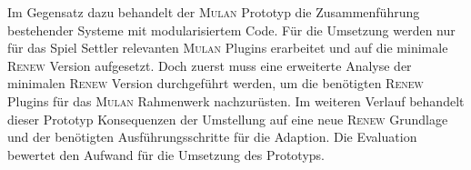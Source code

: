 	Im Gegensatz dazu behandelt der \textsc{Mulan} Prototyp die Zusammenführung bestehender Systeme mit modularisiertem Code. Für die Umsetzung werden nur für das Spiel Settler relevanten \textsc{Mulan} Plugins erarbeitet und auf die minimale \textsc{Renew} Version aufgesetzt. Doch zuerst muss eine erweiterte Analyse der minimalen \textsc{Renew} Version durchgeführt werden, um die benötigten \textsc{Renew} Plugins für das \textsc{Mulan} Rahmenwerk nachzurüsten. Im weiteren Verlauf behandelt dieser Prototyp Konsequenzen der Umstellung auf eine neue \textsc{Renew} Grundlage und der benötigten Ausführungsschritte für die Adaption. Die Evaluation bewertet den Aufwand für die Umsetzung des Prototyps. 
